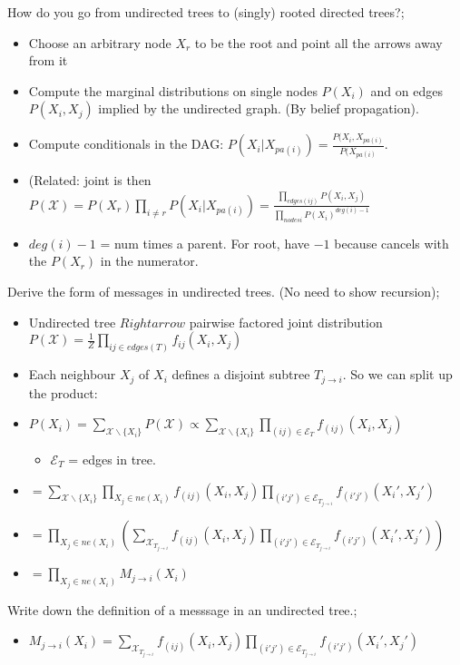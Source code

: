 \documentclass{article}
\begin{document}
How do you go from undirected trees to (singly) rooted directed trees?; \begin{itemize} \item Choose an arbitrary node $X_r$ to be the root and point all the arrows away from it \item Compute the marginal distributions on single nodes $P(X_i)$ and on edges $P(X_i, X_j)$ implied by the undirected graph. (By belief propagation).  \item Compute conditionals in the DAG: $P(X_i|X_{pa(i)}) = \frac{P(X_i, X_{pa(i)}}{P(X_{pa(i)}}$.  \item (Related: joint is then $P(\mathcal{X})=P(X_r)\prod_{i\ne r}P(X_i|X_{pa(i)})=\frac{\prod_{edges(ij)}P(X_i, X_j)}{\prod_{nodes i}P(X_i)^{deg(i)-1}}$ \item $deg(i) - 1$ = num times a parent. For root, have $-1$ because cancels with the $P(X_r)$ in the numerator.  \end{itemize}

Derive the form of messages in undirected trees. (No need to show recursion); \begin{itemize} \item Undirected tree $Rightarrow$ pairwise factored joint distribution $P(\mathcal{X})= \frac{1}{Z}\prod_{ij \in edges(T)}f_{ij}(X_i, X_j)$ \item Each neighbour $X_j$ of $X_i$ defines a disjoint subtree $T_{j\rightarrow i}$. So we can split up the product: \item $P(X_i) = \sum_{\mathcal{X}\backslash\{X_i\}} P(\mathcal{X}) \propto \sum_{\mathcal{X}\backslash\{X_i\}}\prod_{(ij)\in \mathcal{E}_T} f_{(ij)}(X_i, X_j)$ \begin{itemize} \item $\mathcal{E}_T$ = edges in tree.  \end{itemize} \item $= \sum_{\mathcal{X}\backslash\{X_i\}}\prod_{X_j\in ne(X_i)}f_{(ij)}(X_i, X_j)\prod_{(i'j')\in \mathcal{E}_T_{j\rightarrow i}} f_{(i'j')}(X_i', X_j')$ \item $= \prod_{X_j\in ne(X_i)}(\sum_{\mathcal{X}_{T_{j\rightarrow i}}}f_{(ij)}(X_i, X_j)\prod_{(i'j')\in \mathcal{E}_T_{j\rightarrow i}} f_{(i'j')}(X_i', X_j'))$ \item $= \prod_{X_j\in ne(X_i)}M_{j\rightarrow i}(X_i)$ \end{itemize}

Write down the definition of a messsage in an undirected tree.; \begin{itemize} \item  $M_{j\rightarrow i}(X_i) =\sum_{\mathcal{X}_{T_{j\rightarrow i}}}f_{(ij)}(X_i, X_j)\prod_{(i'j')\in \mathcal{E}_T_{j\rightarrow i}} f_{(i'j')}(X_i', X_j')$ \end{itemize} 
\end{document}
